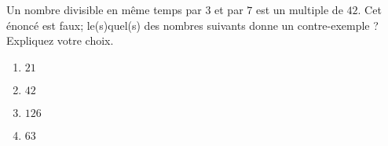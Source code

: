 
\begin{exercice}\label{exosmath-0831}

Un nombre divisible en même temps par \( 3\) et par \( 7\) est un multiple de \( 42\). Cet énoncé est faux; le(s)quel(s) des nombres suivants donne un contre-exemple ? Expliquez votre choix.
\begin{multicols}{2}
    \begin{enumerate}
        \item
            \( 21\)
        \item
            \( 42\)
        \item
            \( 126\)
        \item
            \( 63\)
    \end{enumerate}
\end{multicols}

\end{exercice}
